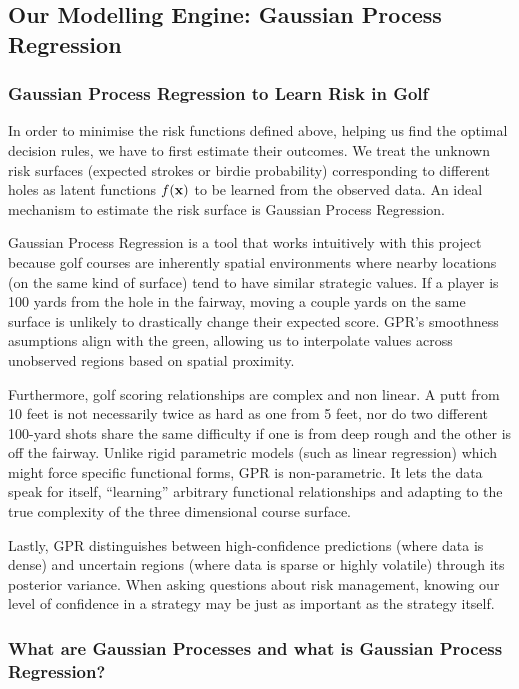 \documentclass[11pt, letterpaper]{article}
\begin{document}
\subsection{Our Modelling Engine: Gaussian Process Regression}

\subsubsection{Gaussian Process Regression to Learn Risk in Golf}
In order to minimise the risk functions defined above, helping us find the optimal decision rules, we have to first estimate their outcomes. We treat the unknown risk surfaces (expected strokes or birdie probability) corresponding to different holes as latent functions $f(\mathbf{x})$ to be learned from the observed data. An ideal mechanism to estimate the risk surface is Gaussian Process Regression.

Gaussian Process Regression is a tool that works intuitively with this project because golf courses are inherently spatial environments where nearby locations (on the same kind of surface) tend to have similar strategic values. If a player is 100 yards from the hole in the fairway, moving a couple yards on the same surface is unlikely to drastically change their expected score. GPR's smoothness asumptions align with the green, allowing us to interpolate values across unobserved regions based on spatial proximity.

Furthermore, golf scoring relationships are complex and non linear. A putt from 10 feet is not necessarily twice as hard as one from 5 feet, nor do two different 100-yard shots share the same difficulty if one is from deep rough and the other is off the fairway. Unlike rigid parametric models (such as linear regression) which might force specific functional forms, GPR is non-parametric. It lets the data speak for itself, ``learning'' arbitrary functional relationships and adapting to the true complexity of the three dimensional course surface.

Lastly, GPR distinguishes between high-confidence predictions (where data is dense) and uncertain regions (where data is sparse or highly volatile) through its posterior variance. When asking questions about risk management, knowing our level of confidence in a strategy may be just as important as the strategy itself.

\subsubsection{What are Gaussian Processes and what is Gaussian Process Regression?}
\end{document}
